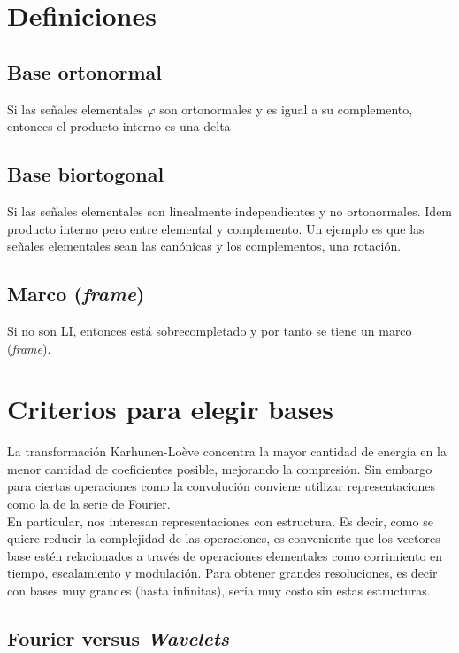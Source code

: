 
	\section{Definiciones}

		\subsection{Base ortonormal}
			Si las señales elementales $\varphi$ son ortonormales y es igual a su complemento, entonces el producto interno es una delta

		\subsection{Base biortogonal}
			Si las señales elementales son linealmente independientes y no ortonormales. Idem producto interno pero entre elemental y complemento.
			Un ejemplo es que las señales elementales sean las canónicas y los complementos, una rotación.

		\subsection{Marco (\emph{frame})}
			Si no son LI, entonces está sobrecompletado y por tanto se tiene un marco (\emph{frame}).

	\section{Criterios para elegir bases}

		La transformación Karhunen-Loève concentra la mayor cantidad de energía en la menor cantidad de coeficientes posible, mejorando la compresión. Sin embargo para ciertas operaciones como la convolución conviene utilizar representaciones como la de la serie de Fourier.\\

		En particular, nos interesan representaciones con estructura. Es decir, como se quiere reducir la complejidad de las operaciones, es conveniente que los vectores base estén relacionados a través de operaciones elementales como corrimiento en tiempo, escalamiento y modulación. Para obtener grandes resoluciones, es decir con bases muy grandes (hasta infinitas), sería muy costo sin estas estructuras.\\


		\subsection{Fourier versus \emph{Wavelets}}

